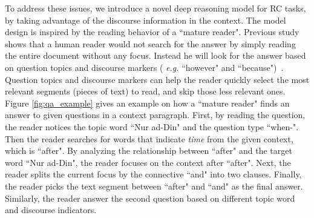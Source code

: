 To address these issues, we introduce a novel deep reasoning model for RC tasks, by taking advantage of the discourse information in the context. The model design is inspired by the reading behavior of a ``mature reader". Previous study shows that a human reader would not search for the answer by simply reading the entire document without any focus. Instead he will look for the answer based on question topics and discourse markers ( \emph{e.g.} ``however" and ``because")~\cite{assiri2011test,sungatullina2016metacognitive}.  Question topics and discourse markers can help the reader quickly select the most relevant segments (pieces of text) to read, and skip those less relevant ones. Figure \ref{fig:qa_example} gives an example on how a ``mature reader" finds an answer to given questions in a context paragraph. First, by reading the question, the reader notices the topic word ``Nur ad-Din" and the question type ``when-". Then the reader searches for words that indicate \emph{time} from the given context, which is ``after". By analyzing the relationship between ``after" and the target word ``Nur ad-Din", the reader focuses on the context after ``after". Next, the reader splits the current focus by the connective ``and" into two clauses. Finally, the reader picks the text segment between ``after" and ``and" as the final answer. Similarly, the reader answer the second question based on different topic word and discourse indicators.






